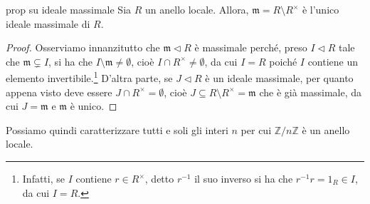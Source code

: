 \begin{prop}[1.7.8]{prop su ideale massimale}
  Sia $R$ un anello locale. Allora, $\mathfrak{m}=R\setminus R^{\times}$ è l'unico ideale massimale di $R$.
\end{prop}
\vspace{-4mm}
\begin{proof}
  Osserviamo innanzitutto che $\mathfrak{m}\lhd R$ è massimale perché, preso $I\lhd R$ tale che $\mathfrak{m} \varsubsetneq I$, 
  si ha che $I\setminus \mathfrak{m}\neq \emptyset$, cioè $I\cap R^{\times}\neq \emptyset$, da cui $I=R$ poiché $I$ contiene un elemento 
  invertibile.\footnote{Infatti, se $I$ contiene $r\in R^{\times}$, detto $r^{-1}$ il suo inverso si ha che $r^{-1}r=1_R\in I$, da cui $I=R$.} 
  D'altra parte, se $J\lhd R$ è un ideale massimale, per quanto appena visto deve essere $J\cap R^{\times}=\emptyset$, 
  cioè $J\subseteq R\setminus R^{\times}=\mathfrak{m}$ che è già massimale, da cui $J=\mathfrak{m}$ e $\mathfrak{m}$ è unico.
\end{proof}

\noindent Possiamo quindi caratterizzare tutti e soli gli interi $n$ per cui $\mathbb{Z}/n\mathbb{Z}$ è un anello locale.

